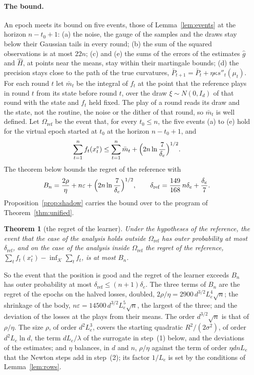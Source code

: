 \documentclass[11pt]{amsart}
\newtheorem{theorem}{Theorem}[section]
\theoremstyle{definition}
\numberwithin{equation}{section}
\newcommand{\cK}{\mathcal{K}}
\begin{document}
\paragraph{The bound.} An epoch meets its bound on five events, those of Lemma~\ref{lem:events} at the horizon $n-t_0+1$: (a) the noise, the gauge of the samples and the draws stay below their Gaussian tails in every round; (b) the sum of the squared observations is at most $22n$; (c) and (e) the sums of the errors of the estimates $\hat g$ and $\hat H$, at points near the means, stay within their martingale bounds; (d) the precision stays close to the path of the true curvatures, $\bar P_{t+1}=\bar P_t+\eta\kappa s''_t(\mu_t)$. For each round $t$ let $\bar m_t$ be the integral of $f_t$ at the point that the reference plays in round $t$ from its state before round $t$, over the draw $\xi\sim N(0,I_d)$ of that round with the state and $f_t$ held fixed. The play of a round reads its draw and the state, not the routine, the noise or the dither of that round, so $\bar m_t$ is well defined. Let $\Omega_{\mathrm{ref}}$ be the event that, for every $t_0\le n$, the five events (a) to (e) hold for the virtual epoch started at $t_0$ at the horizon $n-t_0+1$, and
\begin{equation}\label{eq:az}
\sum_{t=1}^nf_t(x^\circ_t)\le\sum_{t=1}^n\bar m_t+\Bigl(2n\ln\frac7{\delta_e}\Bigr)^{1/2}.
\end{equation}
The theorem below bounds the regret of the reference with
\[
B_n=\frac{2\rho}\eta+n\varepsilon+\Bigl(2n\ln\frac7{\delta_e}\Bigr)^{1/2},\qquad\delta_{\mathrm{ref}}=\frac{149}{168}\,n\delta_e+\frac{\delta_e}7 .
\]
Proposition~\ref{prop:shadow} carries the bound over to the program of Theorem~\ref{thm:unified}.

\begin{theorem}[the regret of the learner]\label{prop:ref}
Under the hypotheses of the reference, the event that the case of the analysis holds outside $\Omega_{\mathrm{ref}}$ has outer probability at most $\delta_{\mathrm{ref}}$, and on the case of the analysis inside $\Omega_{\mathrm{ref}}$ the regret of the reference, $\sum_tf_t(x^\circ_t)-\inf_{\cK}\sum_tf_t$, is at most $B_n$.
\end{theorem}

So the event that the position is good and the regret of the learner exceeds $B_n$ has outer probability at most $\delta_{\mathrm{ref}}\le(n+1)\delta_e$. The three terms of $B_n$ are the regret of the epochs on the halved losses, doubled, $2\rho/\eta=2900\,d^{3/2}L_e^4\sqrt n$; the shrinkage of the body, $n\varepsilon=14500\,d^{3/2}L_e^5\sqrt n$, the largest of the three; and the deviation of the losses at the plays from their means. The order $d^{3/2}\sqrt n$ is that of $\rho/\eta$. The size $\rho$, of order $d^2L_e^3$, covers the starting quadratic $R^2/(2\sigma^2)$, of order $d^2L_e\ln d$, the term $dL_e/\lambda$ of the surrogate in step~(1) below, and the deviations of the estimates; and $\eta$ balances, in $d$ and $n$, $\rho/\eta$ against the term of order $\eta dnL_e$ that the Newton steps add in step~(2); its factor $1/L_e$ is set by the conditions of Lemma~\ref{lem:rows}.
\end{document}

